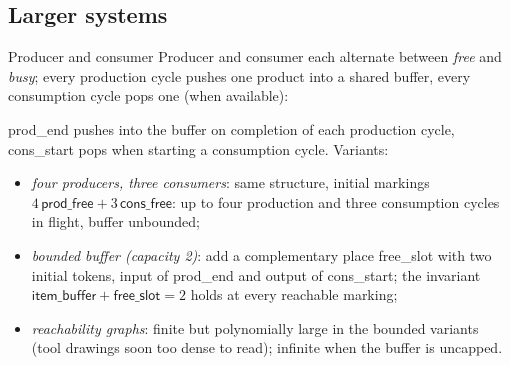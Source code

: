 \subsection{Larger systems}

\begin{examplebox}{Producer and consumer}
Producer and consumer each alternate between \emph{free} and \emph{busy}; every production cycle pushes one product into a shared buffer, every consumption cycle pops one (when available):
\begin{center}
\end{center}
\textsf{prod\_end} pushes into the buffer on completion of each production cycle, \textsf{cons\_start} pops when starting a consumption cycle. Variants:
\begin{itemize}
  \item \emph{four producers, three consumers}: same structure, initial markings $4\,\textsf{prod\_free} + 3\,\textsf{cons\_free}$: up to four production and three consumption cycles in flight, buffer unbounded;
  \item \emph{bounded buffer (capacity 2)}: add a complementary place \textsf{free\_slot} with two initial tokens, input of \textsf{prod\_end} and output of \textsf{cons\_start}; the invariant $\textsf{item\_buffer} + \textsf{free\_slot} = 2$ holds at every reachable marking;
  \item \emph{reachability graphs}: finite but polynomially large in the bounded variants (tool drawings soon too dense to read); infinite when the buffer is uncapped.
\end{itemize}
\end{examplebox}

